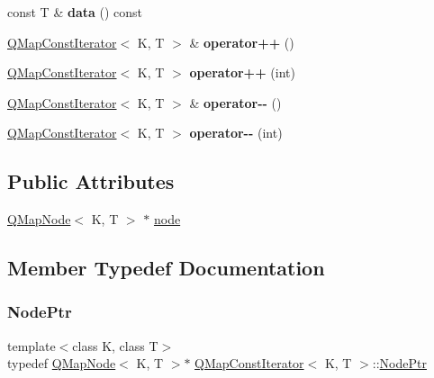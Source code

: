 \begin{DoxyCompactItemize}
const T \& {\bfseries data} () const
\item 
\mbox{\label{class_q_map_const_iterator_ae9b0b32cee40c960eb72be4b3fc12d2a}} 
\mbox{\hyperlink{class_q_map_const_iterator}{Q\+Map\+Const\+Iterator}}$<$ K, T $>$ \& {\bfseries operator++} ()
\item 
\mbox{\label{class_q_map_const_iterator_a5da8218d8c61693ebc1681b6843a1fc0}} 
\mbox{\hyperlink{class_q_map_const_iterator}{Q\+Map\+Const\+Iterator}}$<$ K, T $>$ {\bfseries operator++} (int)
\item 
\mbox{\label{class_q_map_const_iterator_a632cc449def35c955abbd93b30570f92}} 
\mbox{\hyperlink{class_q_map_const_iterator}{Q\+Map\+Const\+Iterator}}$<$ K, T $>$ \& {\bfseries operator-\/-\/} ()
\item 
\mbox{\label{class_q_map_const_iterator_a6f2985c16785befa482d322d80caa55e}} 
\mbox{\hyperlink{class_q_map_const_iterator}{Q\+Map\+Const\+Iterator}}$<$ K, T $>$ {\bfseries operator-\/-\/} (int)
\end{DoxyCompactItemize}
\subsection*{Public Attributes}
\begin{DoxyCompactItemize}
\item 
\mbox{\hyperlink{struct_q_map_node}{Q\+Map\+Node}}$<$ K, T $>$ $\ast$ \mbox{\hyperlink{class_q_map_const_iterator_a8f46f6a6172b01945bae3ca296e3f156}{node}}
\end{DoxyCompactItemize}


\subsection{Member Typedef Documentation}
\mbox{\label{class_q_map_const_iterator_aa466b226e8b1a5bb8dde734c504609c1}} 
\subsubsection{\texorpdfstring{NodePtr}{NodePtr}}
{\footnotesize\ttfamily template$<$class K, class T$>$ \\
typedef \mbox{\hyperlink{struct_q_map_node}{Q\+Map\+Node}}$<$ K, T $>$$\ast$ \mbox{\hyperlink{class_q_map_const_iterator}{Q\+Map\+Const\+Iterator}}$<$ K, T $>$\+::\mbox{\hyperlink{class_q_map_const_iterator_aa466b226e8b1a5bb8dde734c504609c1}{Node\+Ptr}}}

